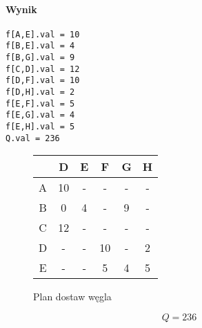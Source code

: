 \documentclass[12pt]{article}
\begin{document}
\paragraph{Wynik}
\begin{lstlisting}[caption=Wynik z glpk]
f[A,E].val = 10
f[B,E].val = 4
f[B,G].val = 9
f[C,D].val = 12
f[D,F].val = 10
f[D,H].val = 2
f[E,F].val = 5
f[E,G].val = 4
f[E,H].val = 5
Q.val = 236
\end{lstlisting}

\begin{figure}[htb]
\caption{Plan dostaw węgla}
\begin{center}
\begin{tabular}{ | c | c | c | c | c | c | }
\hline
  & D & E & F & G & H \\ 
 \hline
 A & 10 & - & - & - & -\\  
 \hline
 B & 0 & 4 & - & 9 & - \\
 \hline  
 C & 12 & - & - & - & - \\
 \hline  
 D & - & - & 10 & - & 2 \\
 \hline  
 E & - & - & 5 & 4 & 5 \\
 \hline  
\end{tabular}
\end{center}
\end{figure}

\[ Q = 236 \]
\end{document}
